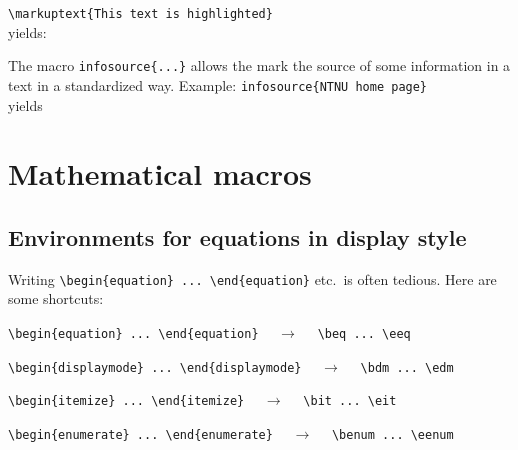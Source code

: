 \documentclass{article}
\begin{document}
\item
\verb"\markuptext{This text is highlighted}"\\
yields:\\

\item
The macro \verb"infosource{...}" allows the mark the source of some information
in a text in a standardized way. Example:
\verb"infosource{NTNU home page}"\\
yields
\eit

\section{Mathematical macros}

\subsection{Environments for equations in display style}

Writing \verb"\begin{equation} ... \end{equation}" etc.\ is often tedious.
Here are some shortcuts:
\bit
\item \verb"\begin{equation} ... \end{equation}" $ \quad \longrightarrow \quad$
\verb"\beq ... \eeq"

\item \verb"\begin{displaymode} ... \end{displaymode}" 
$ \quad \longrightarrow \quad$
\verb"\bdm ... \edm"


\item \verb"\begin{itemize} ... \end{itemize}" 
$ \quad \longrightarrow \quad$
\verb"\bit ... \eit"


\item \verb"\begin{enumerate} ... \end{enumerate}" 
$ \quad \longrightarrow \quad$
\verb"\benum ... \eenum"

\eit

%
\end{document}
